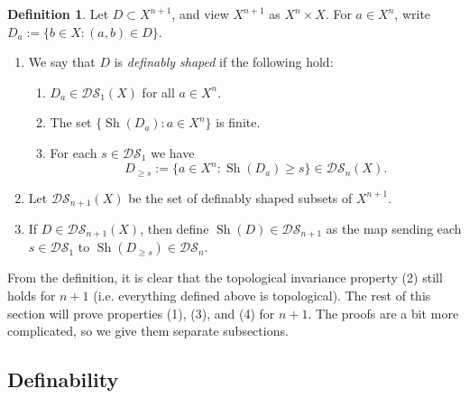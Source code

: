 \documentclass{amsart}
\theoremstyle{definition}
\newtheorem{definition}[theorem]{Definition}
\begin{document}
\begin{definition}\label{D: inductive shaped} Let $D\subset X^{n+1}$, and view $X^{n+1}$ as $X^n\times X$. For $a\in X^n$, write $D_a:=\{b\in X:(a,b)\in D\}$.
    \begin{enumerate}
        \item We say that $D$ is \textit{definably shaped} if the following hold:
        \begin{enumerate}
            \item $D_a\in\mathcal{DS}_1(X)$ for all $a\in X^n$.
            \item The set $\{\operatorname{Sh}(D_a):a\in X^n\}$ is finite.
            \item For each $s\in\mathcal{DS}_1$ we have $$D_{\geq s}:=\{a\in X^n:\operatorname{Sh}(D_a)\geq s\}\in\mathcal{DS}_n(X).$$
            \end{enumerate}
        \item Let $\mathcal{DS}_{n+1}(X)$ be the set of definably shaped subsets of $X^{n+1}$.
        \item If $D\in\mathcal{DS}_{n+1}(X)$, then define $\operatorname{Sh}(D)\in\mathcal{DS}_{n+1}$ as the map sending each $s\in\mathcal{DS}_1$ to $\operatorname{Sh}(D_{\geq s})\in\mathcal{DS}_n$.
\end{enumerate}

\end{definition}

From the definition, it is clear that the topological invariance property (2) still holds for $n+1$ (i.e. everything defined above is topological). The rest of this section will prove properties (1), (3), and (4) for $n+1$. The proofs are a bit more complicated, so we give them separate subsections.

\subsection{Definability}
\end{document}
